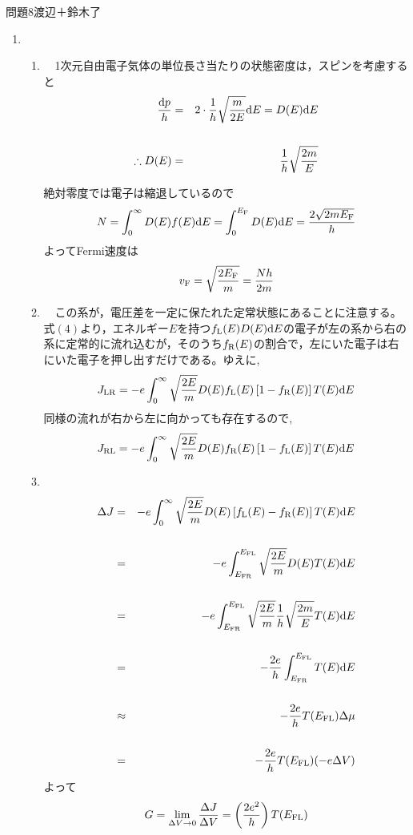 \documentclass[fleqn]{jbook}
\def\F{{\rm F}}
\def\L{{\rm L}}
\def\R{{\rm R}}
\begin{document}
\begin{answer}{問題8}{渡辺＋鈴木了}
\begin{enumerate}
\begin{enumerate}
\end{enumerate}

  \item 　
  
    \begin{enumerate}
    
    \item 　1次元自由電子気体の単位長さ当たりの状態密度は，スピンを考慮すると
\vspace{2mm}
\begin{eqnarray}
\frac{{\rm d}p}{h} &=& 2\cdot \frac{1}{h} \sqrt{\frac{m}{2E}}{\rm d}E = D(E){\rm d}E  \cr
& & \cr
\therefore D(E) &=& \frac{1}{h} \sqrt{\frac{2m}{E}}
\end{eqnarray}
\vspace{2mm}

絶対零度では電子は縮退しているので
\begin{equation}
N = \int _0^{\infty} D(E)f(E)\d E = \int _0^{E_\F} D(E)\d E = \frac{2\sqrt{2mE_\F}}{h} \nonumber
\end{equation}
よってFermi速度は
\begin{equation}
v_\F = \sqrt{\frac{2E_\F}{m}} = \frac{Nh}{2m}
\end{equation}

    
    \item 　この系が，電圧差を一定に保たれた定常状態にあることに注意する。式$(4)$より，エネルギー$E$を持つ$f_{\L}(E)D(E)\d E$の電子が左の系から右の系に定常的に流れ込むが，そのうち$f_{\R}(E)$の割合で，左にいた電子は右にいた電子を押し出すだけである。ゆえに,
\begin{equation}
J_{\L\R} = -e\int_0^{\infty} \sqrt{\frac{2E}{m}} D(E) 
f_\L(E)\left[1-f_\R(E)\right]T(E)\d E
\end{equation}
同様の流れが右から左に向かっても存在するので,
\begin{equation}
J_{\R\L} = -e\int_0^{\infty} \sqrt{\frac{2E}{m}} D(E)
f_\R(E)\left[1-f_\L(E)\right]T(E)\d E
\end{equation}

    \item 　
\begin{eqnarray}
\Delta J & =& -e\int_0^{\infty} \sqrt{\frac{2E}{m}} D(E)\left[f_\L(E)-f_\R(E)\right]T(E)\d E \cr
         & & \cr
         & =& -e\int_{E_{\F\R}}^{E_{\F\L}} \sqrt{\frac{2E}{m}} D(E)T(E)\d E \cr
         & & \cr
         & =& -e\int_{E_{\F\R}}^{E_{\F\L}} \sqrt{\frac{2E}{m}} \frac{1}{h} \sqrt{\frac{2m}{E}} T(E)\d E \cr
         & & \cr
         & =& -\frac{2e}{h} \int_{E_{\F\R}}^{E_{\F\L}} T(E)\d E \cr
         & & \cr
         & \approx& -\frac{2e}{h} T(E_{\F\L})\Delta \mu \cr
         & & \cr
         & =& -\frac{2e}{h} T(E_{\F\L})(-e\Delta V)
\end{eqnarray}
よって
\begin{equation}
G = \mathop {\lim }\limits_{\Delta V \to 0} \frac{\Delta J}{\Delta V} = \left(\frac{2e^2}{h}\right)T(E_{\F\L})
\end{equation}
    

\end{enumerate}
\end{enumerate}
\end{answer}
\end{document}
